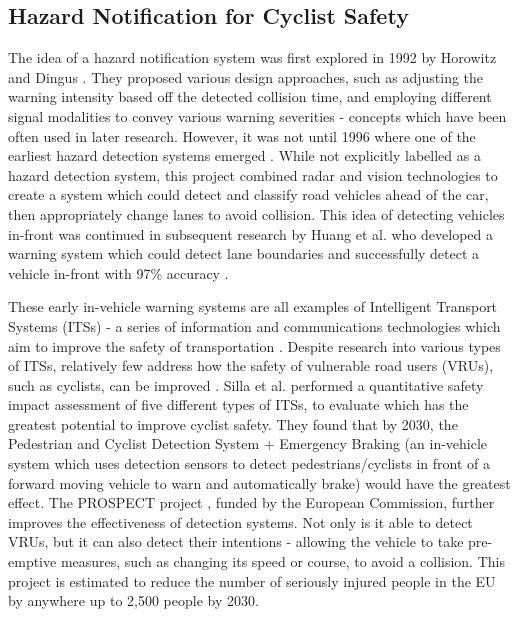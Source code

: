 \documentclass{interim}
\begin{document}
\subsection{Hazard Notification for Cyclist Safety}
The idea of a hazard notification system was first explored in 1992 by Horowitz and Dingus \cite{doi:10.1177/154193129203601320}. They proposed various design approaches, such as adjusting the warning intensity based off the detected collision time, and employing different signal modalities to convey various warning severities - concepts which have been often used in later research. However, it was not until 1996 where one of the earliest hazard detection systems emerged \cite{566402}. While not explicitly labelled as a hazard detection system, this project combined radar and vision technologies to create a system which could detect and classify road vehicles ahead of the car, then appropriately change lanes to avoid collision. This idea of detecting vehicles in-front was continued in subsequent research by Huang et al. who developed a warning system which could detect lane boundaries and successfully detect a vehicle in-front with 97\% accuracy \cite{1307429}.

These early in-vehicle warning systems are all examples of Intelligent Transport Systems (ITSs) - a series of information and communications technologies which aim to improve the safety of transportation \cite{its}. Despite research into various types of ITSs, relatively few address how the safety of vulnerable road users (VRUs), such as cyclists, can be improved \cite{Scholliers2017}. Silla et al. \cite{SILLA2017134} performed a quantitative safety impact assessment of five different types of ITSs, to evaluate which has the greatest potential to improve cyclist safety. They found that by 2030, the Pedestrian and Cyclist Detection System + Emergency Braking (an in-vehicle system which uses detection sensors to detect pedestrians/cyclists in front of a forward moving vehicle to warn and automatically brake) would have the greatest effect. The PROSPECT project \cite{cieslik2019improving}, funded by the European Commission, further improves the effectiveness of detection systems. Not only is it able to detect VRUs, but it can also detect their intentions - allowing the vehicle to take pre-emptive measures, such as changing its speed or course, to avoid a collision. This project is estimated to reduce the number of seriously injured people in the EU by anywhere up to 2,500 people by 2030.
\end{document}
